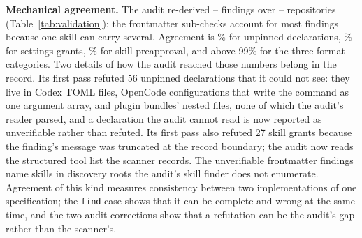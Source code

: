 \documentclass[10pt,conference]{IEEEtran}
\providecommand{\AuditFindings}{--}\providecommand{\AuditRepos}{--}
\newcommand{\vnew}{8.0.2}
\newcommand{\pct}[1]{#1\%}
\begin{document}
\begin{table}[t]
\centering
\caption{Validation of the \vnew{} findings. Mechanical re-derivation per finding, and the first iteration's human verdicts joined to the \vnew{} repository-rule pairs. \emph{Agree} is agreement between the human verdict and the mechanical inclusion decision on rated pairs.}
\label{tab:validation}
\footnotesize
{}
\end{table}

\textbf{Mechanical agreement.} The audit re-derived \AuditFindings{} findings over \AuditRepos{} repositories (Table~\ref{tab:validation}); the frontmatter sub-checks account for most findings because one skill can carry several. Agreement is \pct{\AuditSOneAgree} for unpinned declarations, \pct{\AuditSTwoAgree} for settings grants, \pct{\AuditSThreeAgree} for skill preapproval, and above \pct{99} for the three format categories. Two details of how the audit reached those numbers belong in the record. Its first pass refuted 56 unpinned declarations that it could not see: they live in Codex TOML files, OpenCode configurations that write the command as one argument array, and plugin bundles' nested files, none of which the audit's reader parsed, and a declaration the audit cannot read is now reported as unverifiable rather than refuted. Its first pass also refuted 27 skill grants because the finding's message was truncated at the record boundary; the audit now reads the structured tool list the scanner records. The \AuditPOneUnverifiable{} unverifiable frontmatter findings name skills in discovery roots the audit's skill finder does not enumerate. Agreement of this kind measures consistency between two implementations of one specification; the \texttt{find} case shows that it can be complete and wrong at the same time, and the two audit corrections show that a refutation can be the audit's gap rather than the scanner's.
\end{document}
